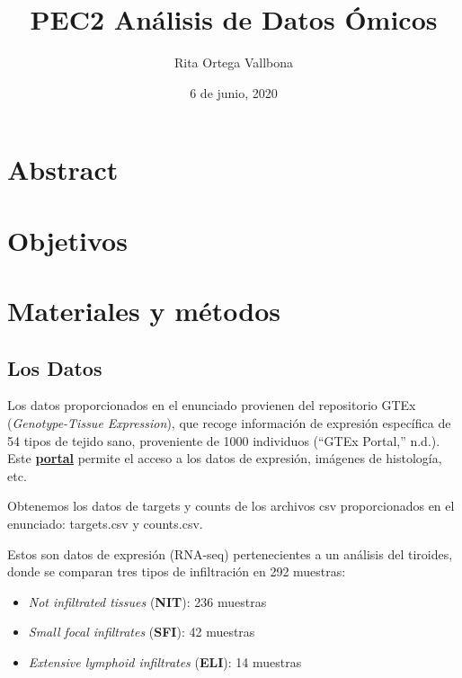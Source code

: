 \documentclass[
  english,
]{article}
\title{PEC2 Análisis de Datos Ómicos}
\author{Rita Ortega Vallbona}
\date{6 de junio, 2020}
\providecommand{\tightlist}{%
  \setlength{\itemsep}{0pt}\setlength{\parskip}{0pt}}
\begin{document}
\maketitle

{
\setcounter{tocdepth}{3}
\tableofcontents
}
\hypertarget{abstract}{%
\section{Abstract}\label{abstract}}

\hypertarget{objetivos}{%
\section{Objetivos}\label{objetivos}}

\hypertarget{materiales-y-muxe9todos}{%
\section{Materiales y métodos}\label{materiales-y-muxe9todos}}

\hypertarget{los-datos}{%
\subsection{Los Datos}\label{los-datos}}

Los datos proporcionados en el enunciado provienen del repositorio GTEx
(\emph{Genotype-Tissue Expression}), que recoge información de expresión
específica de 54 tipos de tejido sano, proveniente de 1000 individuos
(``GTEx Portal,'' n.d.). Este
\href{https://www.gtexportal.org/home/}{\textbf{portal}} permite el
acceso a los datos de expresión, imágenes de histología, etc.

Obtenemos los datos de targets y counts de los archivos csv
proporcionados en el enunciado: targets.csv y counts.csv.

Estos son datos de expresión (RNA-seq) pertenecientes a un análisis del
tiroides, donde se comparan tres tipos de infiltración en 292 muestras:

\begin{itemize}
\tightlist
\item
  \emph{Not infiltrated tissues} (\textbf{NIT}): 236 muestras
\item
  \emph{Small focal infiltrates} (\textbf{SFI}): 42 muestras
\item
  \emph{Extensive lymphoid infiltrates} (\textbf{ELI}): 14 muestras
\end{itemize}
\end{document}
